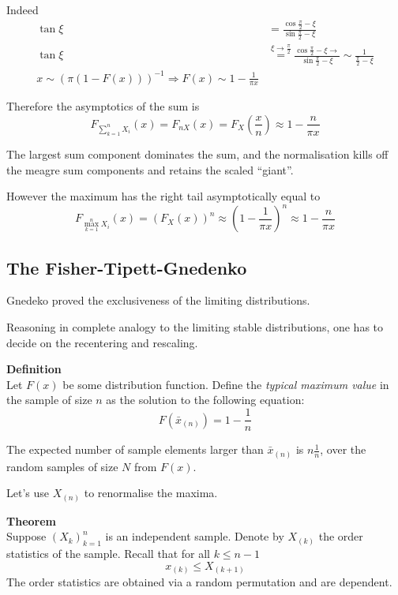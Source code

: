\documentclass[a4paper]{article}
\newcommand{\brac}[1]{{\left ( #1 \right )}}
\begin{document}
Indeed 
\begin{align*}
	\tan \xi
	&= \frac{\cos \frac{\pi}{2} - \xi}{\sin \frac{\pi}{2} - \xi}\\
	\tan \xi &\overset{\xi\to \frac{\pi}{2}}{=} \frac{\cos \frac{\pi}{2} - \xi \to }{\sin \frac{\pi}{2} - \xi}\sim \frac{1}{\frac{\pi}{2} - \xi}\\
	x\sim \brac{\pi\brac{1-F(x)}}^{-1} \Rightarrow F(x)\sim 1-\frac{1}{\pi x}
\end{align*}

Therefore the asymptotics of the sum is
\[F_{\sum_{k=1}^n X_i} (x) = F_{nX}(x) = F_X(\frac{x}{n})\approx 1 - \frac{n}{\pi x}\]

The largest sum component dominates the sum, and the normalisation kills off the meagre sum components and retains the scaled ``giant''.

However the maximum has the right tail asymptotically equal to
\[F_{\max_{k=1}^n X_i} (x) = \brac{F_X(x)}^n \approx \brac{1 - \frac{1}{\pi x}}^n \approx 1 - \frac{n}{\pi x}\]


\subsection{The Fisher-Tipett-Gnedenko} %
\label{sub:the_fisher_tipett}

Gnedeko proved the exclusiveness of the limiting distributions.

Reasoning in complete analogy to the limiting stable distributions, one has to decide on the recentering and rescaling.

\noindent \textbf{Definition}\hfill\\
Let $F(x)$ be some distribution function. Define the \emph{typical maximum value} in the sample of size $n$ as the solution to the following equation: \[F(\bar{x}_{(n)}) = 1-\frac{1}{n}\]

The expected number of sample elements larger than $\bar{x}_{(n)}$ is $n\frac{1}{n}$, over the random samples of size $N$ from $F(x)$.

Let's use $X_{(n)}$ to renormalise the maxima.

\noindent\textbf{Theorem}\hfill\\
Suppose $\brac{X_k}_{k=1}^n$ is an independent sample. Denote by $X_{(k)}$ the order statistics of the sample. Recall that for all $k\leq n-1$
\[x_{(k)}\leq X_{(k+1)}\]
The order statistics are obtained via a random permutation and are dependent.
\end{document}
